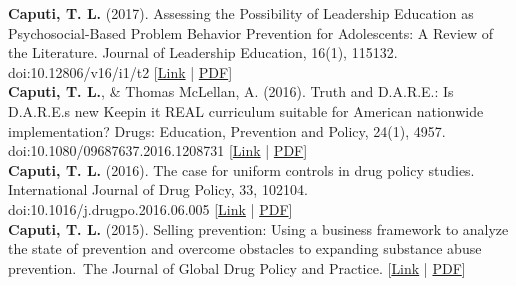 \textbf{Caputi, T. L.} (2017). Assessing the Possibility of Leadership Education as Psychosocial-Based Problem Behavior Prevention for Adolescents: A Review of the Literature. Journal of Leadership Education, 16(1), 115132. doi:10.12806/v16/i1/t2 [\href{https://journalofleadershiped.org/wp-content/uploads/2019/02/16_1_caputi.pdf}{Link} | \href{https://www.theodorecaputi.com/files/JOLE-2017.pdf}{PDF}] \\[.2cm]
\textbf{Caputi, T. L.}, & Thomas McLellan, A. (2016). Truth and D.A.R.E.: Is D.A.R.E.s new Keepin it REAL curriculum suitable for American nationwide implementation? Drugs: Education, Prevention and Policy, 24(1), 4957. doi:10.1080/09687637.2016.1208731 [\href{https://www.tandfonline.com/doi/full/10.1080/09687637.2016.1208731}{Link} | \href{https://www.theodorecaputi.com/files/DEPP-2016.pdf}{PDF}] \\[.2cm]
\textbf{Caputi, T. L.} (2016). The case for uniform controls in drug policy studies. International Journal of Drug Policy, 33, 102104. doi:10.1016/j.drugpo.2016.06.005 [\href{https://www.sciencedirect.com/science/article/abs/pii/S095539591630175X}{Link} | \href{https://www.theodorecaputi.com/files/IJDP-2016.pdf}{PDF}] \\[.2cm]
\textbf{Caputi, T. L.} (2015). Selling prevention: Using a business framework to analyze the state of prevention and overcome obstacles to expanding substance abuse prevention. The Journal of Global Drug Policy and Practice. [\href{https://archive.is/CUkqN}{Link} | \href{https://www.theodorecaputi.com/files/JGDPP-2015.pdf}{PDF}] \\[.2cm]

